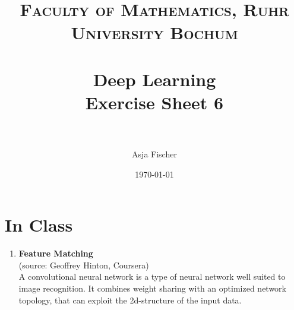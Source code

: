 \documentclass[paper=a4, fontsize=11pt]{scrartcl} %
\title{	
\normalfont \normalsize 
\textsc{Faculty of Mathematics, Ruhr University Bochum} \\ [25pt] %
\horrule{0.5pt} \\[0.4cm] %
\huge Deep Learning\\{\Large Exercise Sheet 6}\\ %
\horrule{2pt} \\[0.5cm] %
}
\author{Asja Fischer} %
\date{\normalsize\today} %
\numberwithin{equation}{section} %
\numberwithin{figure}{section} %
\numberwithin{table}{section} %
\begin{document}
\maketitle %
\section{In Class}
\begin{enumerate} 


\item \textbf{Feature Matching}\\
(source: Geoffrey Hinton, Coursera)\\
A convolutional neural network is a type of neural network well suited to image recognition. It combines weight sharing with an optimized network topology, that can exploit the 2d-structure of the input data.


\end{enumerate}
\end{document}

